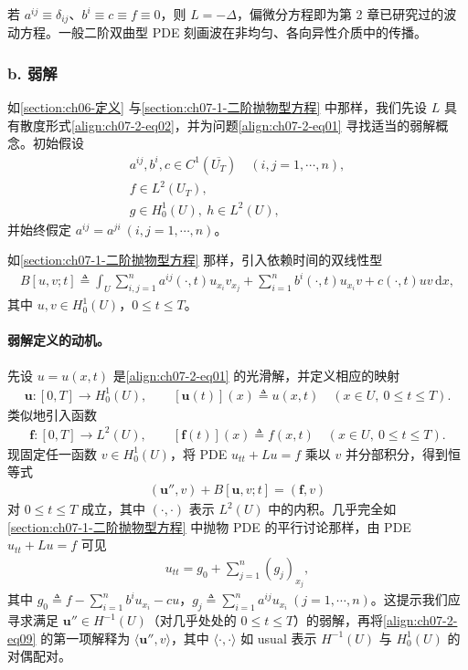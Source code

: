 \documentclass[../../main.tex]{subfiles}
\begin{document}
若 $a^{ij}\equiv\delta_{ij}$、$b^i\equiv c\equiv f\equiv 0$，则 $L=-\Delta$，偏微分方程即为第 2 章已研究过的波动方程。一般二阶双曲型 PDE 刻画波在非均匀、各向异性介质中的传播。

\subsubsection*{b. 弱解}

如\cref{section:ch06-定义} 与\cref{section:ch07-1-二阶抛物型方程} 中那样，我们先设 $L$ 具有散度形式\eqref{align:ch07-2-eq02}，并为问题\eqref{align:ch07-2-eq01} 寻找适当的弱解概念。初始假设
\begin{align}
a^{ij},b^i,c\in C^1(\overline{U_T})\quad (i,j=1,\cdots,n),\label{align:ch07-2-eq05}\\
f\in L^2(U_T),\label{align:ch07-2-eq06}\\
g\in H^1_0(U),\ h\in L^2(U),\label{align:ch07-2-eq07}
\end{align}
并始终假定 $a^{ij}=a^{ji}\ (i,j=1,\cdots,n)$。

如\cref{section:ch07-1-二阶抛物型方程} 那样，引入依赖时间的双线性型
\begin{align}
B[u,v;t]\triangleq \int_U \sum_{i,j=1}^n a^{ij}(\cdot,t)u_{x_i}v_{x_j} + \sum_{i=1}^n b^i(\cdot,t)u_{x_i}v + c(\cdot,t)uv\,\mathrm{d}x,\label{align:ch07-2-eq08}
\end{align}
其中 $u,v\in H^1_0(U)$，$0\leqslant t\leqslant T$。

\paragraph{弱解定义的动机。}先设 $u=u(x,t)$ 是\eqref{align:ch07-2-eq01} 的光滑解，并定义相应的映射
\begin{align*}
\mathbf{u}:[0,T]\to H^1_0(U),\qquad [\mathbf{u}(t)](x)\triangleq u(x,t)\quad (x\in U,\ 0\leqslant t\leqslant T).
\end{align*}
类似地引入函数
\begin{align*}
\mathbf{f}:[0,T]\to L^2(U),\qquad [\mathbf{f}(t)](x)\triangleq f(x,t)\quad (x\in U,\ 0\leqslant t\leqslant T).
\end{align*}
现固定任一函数 $v\in H^1_0(U)$，将 PDE $u_{tt}+Lu=f$ 乘以 $v$ 并分部积分，得到恒等式
\begin{align}
(\mathbf{u}'',v)+B[\mathbf{u},v;t]=(\mathbf{f},v)\label{align:ch07-2-eq09}
\end{align}
对 $0\leqslant t\leqslant T$ 成立，其中 $(\cdot,\cdot)$ 表示 $L^2(U)$ 中的内积。几乎完全如\cref{section:ch07-1-二阶抛物型方程} 中抛物 PDE 的平行讨论那样，由 PDE $u_{tt}+Lu=f$ 可见
\begin{align*}
u_{tt}=g_0+\sum_{j=1}^n (g_j)_{x_j},
\end{align*}
其中 $g_0\triangleq f-\sum_{i=1}^n b^i u_{x_i}-cu$，$g_j\triangleq\sum_{i=1}^n a^{ij}u_{x_i}\ (j=1,\cdots,n)$。这提示我们应寻求满足 $\mathbf{u}''\in H^{-1}(U)$（对几乎处处的 $0\leqslant t\leqslant T$）的弱解，再将\eqref{align:ch07-2-eq09} 的第一项解释为 $\langle\mathbf{u}'',v\rangle$，其中 $\langle\cdot,\cdot\rangle$ 如 usual 表示 $H^{-1}(U)$ 与 $H^1_0(U)$ 的对偶配对。
\end{document}
